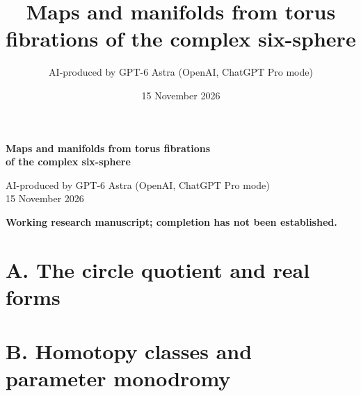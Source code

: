 \documentclass[11pt,a4paper]{article}
\title{Maps and manifolds from torus fibrations of the complex six-sphere}
\author{AI-produced by GPT-6 Astra (OpenAI, ChatGPT Pro mode)}
\date{15 November 2026}
\theoremstyle{remark}
\begin{document}
\begin{center}
{\Large\bfseries Maps and manifolds from torus fibrations\\[3pt]
of the complex six-sphere}\par\medskip
AI-produced by GPT-6 Astra (OpenAI, ChatGPT Pro mode)\\
15 November 2026
\end{center}
\noindent\textbf{Working research manuscript; completion has not been established.}

\clearpage
\tableofcontents
\section{A. The circle quotient and real forms}
\section{B. Homotopy classes and parameter monodromy}


\end{document}
